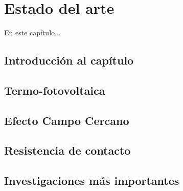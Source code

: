 \chapter{Estado del arte}


En este capítulo...
\cite{noauthor_parallel-plate_nodate}
\cite{doi:MicroGapTPV}
\cite{doi:Thermoionic_Campbell}
\cite{doi:Near-field_ThinFilm}

\section{Introducción al capítulo}
\section{Termo-fotovoltaica}

\section{Efecto Campo Cercano}
\section{Resistencia de contacto}
\section{Investigaciones más importantes}

